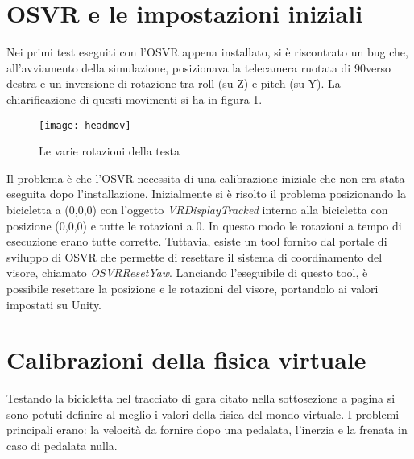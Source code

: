 \section{OSVR e le impostazioni iniziali}
\noindent Nei primi test eseguiti con l'OSVR appena installato, si è riscontrato un bug che, all'avviamento della simulazione, posizionava la telecamera ruotata di 90\degree verso destra e un inversione di rotazione tra roll (su Z) e pitch (su Y). La chiarificazione di questi movimenti si ha in figura \ref{fig:headmov}.
\begin{figure}[htb]
    \centering
    \texttt{[image: headmov]}
    \caption{Le varie rotazioni della testa\label{fig:headmov}}
    \vspace{-0.3cm}
\end{figure}
\noindent Il problema è che l'OSVR necessita di una calibrazione iniziale che non era stata eseguita dopo l'installazione. Inizialmente si è risolto il problema posizionando la bicicletta a (0,0,0) con l'oggetto \textit{VRDisplayTracked} interno alla bicicletta con posizione (0,0,0) e tutte le rotazioni a 0. In questo modo le rotazioni a tempo di esecuzione erano tutte corrette. Tuttavia, esiste un tool fornito dal portale di sviluppo di OSVR che permette di resettare il sistema di coordinamento del visore, chiamato \textit{OSVRResetYaw}. Lanciando l'eseguibile di questo tool, è possibile resettare la posizione e le rotazioni del visore, portandolo ai valori impostati su Unity.

\section{Calibrazioni della fisica virtuale}
Testando la bicicletta nel tracciato di gara citato nella sottosezione  a pagina \pageref{ambientazione} si sono potuti definire al meglio i valori della fisica del mondo virtuale. I problemi principali erano: la velocità da fornire dopo una pedalata, l'inerzia e la frenata in caso di pedalata nulla. 

